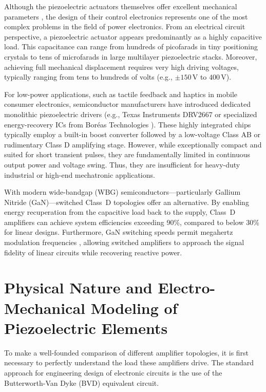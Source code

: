 \documentclass[10pt, conference, letterpaper]{IEEEtran}
\begin{document}
Although the piezoelectric actuators themselves offer excellent mechanical parameters \cite{ieee_std_piezo}, the design of their control electronics represents one of the most complex problems in the field of power electronics. From an electrical circuit perspective, a piezoelectric actuator appears predominantly as a highly capacitive load. This capacitance can range from hundreds of picofarads in tiny positioning crystals to tens of microfarads in large multilayer piezoelectric stacks. Moreover, achieving full mechanical displacement requires very high driving voltages, typically ranging from tens to hundreds of volts (e.g., $\pm 150$\,V to $400$\,V).

For low-power applications, such as tactile feedback and haptics in mobile consumer electronics, semiconductor manufacturers have introduced dedicated monolithic piezoelectric drivers (e.g., Texas Instruments DRV2667 \cite{ti_drv2667} or specialized energy-recovery ICs from Bor\'{e}as Technologies \cite{boreas_bos1901}). These highly integrated chips typically employ a built-in boost converter followed by a low-voltage Class AB or rudimentary Class D amplifying stage. However, while exceptionally compact and suited for short transient pulses, they are fundamentally limited in continuous output power and voltage swing. Thus, they are insufficient for heavy-duty industrial or high-end mechatronic applications.

With modern wide-bandgap (WBG) semiconductors—particularly Gallium Nitride (GaN)—switched Class~D topologies offer an alternative. By enabling energy recuperation from the capacitive load back to the supply, Class~D amplifiers can achieve system efficiencies exceeding 90\%, compared to below 30\% for linear designs. Furthermore, GaN switching speeds permit megahertz modulation frequencies \cite{HfGan_power_integration}, allowing switched amplifiers to approach the signal fidelity of linear circuits while recovering reactive power.

\section{Physical Nature and Electro-Mechanical Modeling of Piezoelectric Elements}
To make a well-founded comparison of different amplifier topologies, it is first necessary to perfectly understand the load these amplifiers drive. The standard approach for engineering design of electronic circuits is the use of the Butterworth-Van Dyke (BVD) equivalent circuit.
\end{document}
